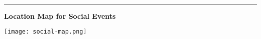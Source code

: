 \documentclass[a4paper,11pt]{article}
\newcommand{\header}[4]{{\noindent \makebox[2cm][l]{ } \hfill 
    \hfill \makebox[2cm][r]{ } \vspace{-1ex} \\ \rule{\textwidth}{0pt}
    \begin{center} \Large\sffamily\bfseries #4 \end{center}} \vspace{5ex}}
\begin{document}


\header{}{}{}{Location Map for Social Events}
\vfil
\texttt{[image: social-map.png]}
\vfil
\end{document}
